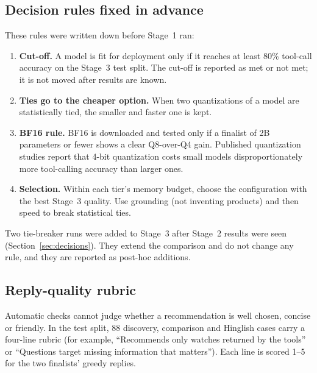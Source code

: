 \documentclass[11pt,a4paper]{article}
\begin{document}
\subsection{Decision rules fixed in advance}\label{sec:rules}
These rules were written down before Stage~1 ran:
\begin{enumerate}
  \item \textbf{Cut-off.} A model is fit for deployment only if it reaches at least 80\% tool-call accuracy on the
        Stage~3 test split. The cut-off is reported as met or not met; it is not moved after results are known.
  \item \textbf{Ties go to the cheaper option.} When two quantizations of a model are statistically tied, the smaller
        and faster one is kept.
  \item \textbf{BF16 rule.} BF16 is downloaded and tested only if a finalist of 2B parameters or fewer shows a clear
        Q8-over-Q4 gain. Published quantization studies report that 4-bit quantization costs small models
        disproportionately more tool-calling accuracy than larger ones.
  \item \textbf{Selection.} Within each tier's memory budget, choose the configuration with the best Stage~3 quality.
        Use grounding (not inventing products) and then speed to break statistical ties.
\end{enumerate}
Two tie-breaker runs were added to Stage~3 after Stage~2 results were seen (Section~\ref{sec:decisions}). They extend
the comparison and do not change any rule, and they are reported as post-hoc additions.

\subsection{Reply-quality rubric}\label{sec:rubricmethod}
Automatic checks cannot judge whether a recommendation is well chosen, concise or friendly. In the test split, 88
discovery, comparison and Hinglish cases carry a four-line rubric (for example, ``Recommends only watches returned by the
tools'' or ``Questions target missing information that matters''). Each line is scored 1--5 for the two finalists'
greedy replies.
\end{document}
